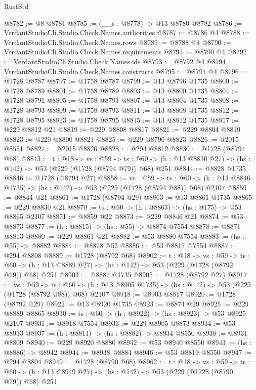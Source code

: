 \begin{lexlean}{RustStd}
\begin{coremodule}
@8782 := @8 @8781
@8785 := (__s : @8778) -> @13 @8780 @8782
@8786 := VerdantStudioCli.Studio.Check.Names.authorities
@8787 := @8786 @4
@8788 := VerdantStudioCli.Studio.Check.Names.rows
@8789 := @8788 @4
@8790 := VerdantStudioCli.Studio.Check.Names.requirements
@8791 := @8790 @4
@8792 := VerdantStudioCli.Studio.Check.Names.ids
@8793 := @8792 @4
@8794 := VerdantStudioCli.Studio.Check.Names.constructs
@8795 := @8794 @4
@8796 := @1728 @8787
@8797 := @1758 @8787
@8799 := @13 @8796 @1735
@8800 := @1728 @8789
@8801 := @1758 @8789
@8803 := @13 @8800 @1735
@8804 := @1728 @8791
@8805 := @1758 @8791
@8807 := @13 @8804 @1735
@8808 := @1728 @8793
@8809 := @1758 @8793
@8811 := @13 @8808 @1735
@8812 := @1728 @8795
@8813 := @1758 @8795
@8815 := @13 @8812 @1735
@8817 := @229 @8812 @21
@8819 := @229 @8808 @8817
@8821 := @229 @8804 @8819
@8823 := @229 @8800 @8821
@8825 := @229 @8796 @8823
@8826 := @2015 @8551
@8827 := @2015 @8826
@8828 := @294 @8812
@8830 := @1728 (@8794 @68)
@8843 := {t : @18} ->
  {vs : @59} ->
  {ts : @60} -> (h : @13 @8830 @27) -> (hs : @142) -> @53 (@229 (@1728 (@8794 @79)) @68) @251
@8844 := @8828 @1735
@8846 := @1728 (@8794 @27)
@8858 := {vs : @59} ->
  {ts : @60} -> (h : @13 @8846 @1735) -> (hs : @142) -> @53 (@229 (@1728 (@8794 @88)) @68) @2107
@8859 := @8844 @21
@8861 := @1728 (@8794 @29)
@8863 := @13 @8861 @1735
@8865 := @229 @8830 @21
@8870 := {ts : @60} -> (h : @8863) -> (hs : @175) -> @53 @8865 @2107
@8871 := @8859 @22
@8873 := @229 @8846 @21
@8874 := @53 @8873
@8877 := (h : @8815) -> (hs : @55) -> @8874 @7554
@8878 := @8871 @8813
@8880 := @229 @8861 @21
@8882 := @53 @8880 @7554
@8883 := (hs : @55) -> @8882
@8884 := @8878 @52
@8886 := @53 @8817 @7554
@8887 := @294 @8808
@8889 := @1728 (@8792 @68)
@8902 := {t : @18} ->
  {vs : @59} ->
  {ts : @60} -> (h : @13 @8889 @27) -> (hs : @142) -> @53 (@229 (@1728 (@8792 @79)) @68) @251
@8903 := @8887 @1735
@8905 := @1728 (@8792 @27)
@8917 := {vs : @59} ->
  {ts : @60} -> (h : @13 @8905 @1735) -> (hs : @142) -> @53 (@229 (@1728 (@8792 @88)) @68) @2107
@8918 := @8903 @8817
@8920 := @1728 (@8792 @29)
@8922 := @13 @8920 @1735
@8923 := @8874 @29
@8925 := @229 @8889 @8865
@8930 := {ts : @60} -> (h : @8922) -> (hs : @8923) -> @53 @8925 @2107
@8931 := @8918 @7554
@8933 := @229 @8905 @8873
@8934 := @53 @8933
@8937 := (h : @8811) -> (hs : @8882) -> @8934 @8550
@8938 := @8931 @8809
@8940 := @229 @8920 @8880
@8942 := @53 @8940 @8550
@8943 := (hs : @8886) -> @8942
@8944 := @8938 @8884
@8946 := @53 @8819 @8550
@8947 := @294 @8804
@8949 := @1728 (@8790 @68)
@8962 := {t : @18} ->
  {vs : @59} ->
  {ts : @60} -> (h : @13 @8949 @27) -> (hs : @142) -> @53 (@229 (@1728 (@8790 @79)) @68) @251

\end{coremodule}
\end{lexlean}
